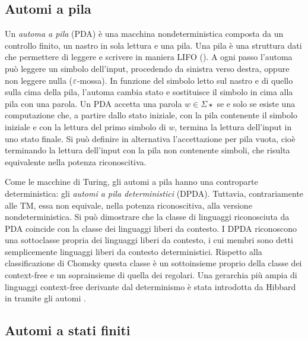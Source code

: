 \subsection{Automi a pila}\label{subs:prel:PDA}
Un \emph{automa a pila} (PDA) è una macchina nondeterministica composta da un controllo finito, un nastro in sola lettura e una pila. Una pila è una struttura dati che permettere di leggere e scrivere in maniera LIFO (). A ogni passo l'automa può leggere un simbolo dell'input, procedendo da sinistra verso destra, oppure non leggere nulla ($\varepsilon$-mossa). In funzione del simbolo letto sul nastro e di quello sulla cima della pila, l'automa cambia stato e sostituisce il simbolo in cima alla pila con una parola. Un PDA accetta una parola $w\in\Sigma\star$ se e solo se esiste una computazione che, a partire dallo stato iniziale, con la pila contenente il simbolo iniziale e con la lettura del primo simbolo di $w$, termina la lettura dell'input in uno stato finale. Si può definire in alternativa l'accettazione per pila vuota, cioè terminando la lettura dell'input con la pila non contenente simboli, che risulta equivalente nella potenza riconoscitiva.

Come le macchine di Turing, gli automi a pila hanno una controparte deterministica: gli \emph{automi a pila deterministici} (DPDA). Tuttavia, contrariamente alle TM, essa non equivale, nella potenza riconoscitiva, alla versione nondeterministica. Si può dimostrare che la classe di linguaggi riconosciuta da PDA coincide con la classe dei linguaggi liberi da contesto. I DPDA riconoscono una sottoclasse propria dei linguaggi liberi da contesto, i cui membri sono detti semplicemente linguaggi liberi da contesto deterministici. Rispetto alla classificazione di Chomsky questa classe è un sottoinsieme proprio della classe dei context-free e un soprainsieme di quella dei regolari. Una gerarchia più ampia di linguaggi context-free derivante dal determinismo è stata introdotta da Hibbard in \cite{Hibbard:67:CFdet} tramite gli automi .


\subsection{Automi a stati finiti}\label{subs:prel:NFA}


